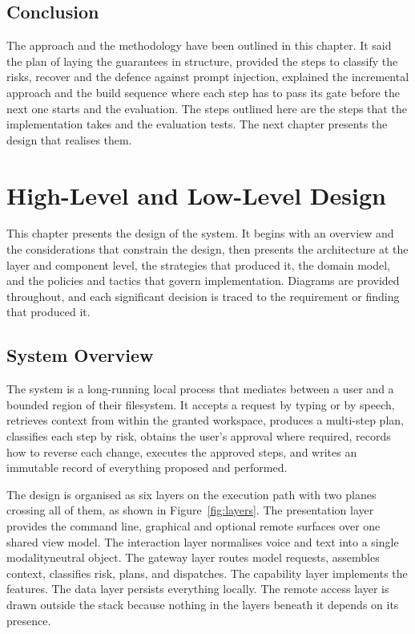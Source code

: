 \documentclass{FastFyp}
\begin{document}
\section{Conclusion}
The approach and the methodology have been outlined in this chapter. It said the plan of laying the guarantees in structure, provided the steps to classify the risks, recover and the defence against prompt injection, explained the incremental approach and the build sequence where each step has to pass its gate before the next one starts and the evaluation. The steps outlined here are the steps that the implementation takes and the evaluation tests. The next chapter presents the design that realises them.

\chapter{High-Level and Low-Level Design}
This chapter presents the design of the system. It begins with an overview and the considerations that constrain the design, then presents the architecture at the layer and component level, the strategies that produced it, the domain model, and the policies and tactics that govern implementation. Diagrams are provided throughout, and each significant decision is traced to the requirement or finding that produced it.

\section{System Overview}
The system is a long-running local process that mediates between a user and a bounded region of their filesystem. It accepts a request by typing or by speech, retrieves context from within the granted workspace, produces a multi-step plan, classifies each step by risk, obtains the user's approval where required, records how to reverse each change, executes the approved steps, and writes an immutable record of everything proposed and performed.

The design is organised as six layers on the execution path with two planes crossing all of them, as shown in Figure~\ref{fig:layers}. The presentation layer provides the command line, graphical and optional remote surfaces over one shared view model. The interaction layer normalises voice and text into a single modalityneutral object. The gateway layer routes model requests, assembles context, classifies risk, plans, and dispatches. The capability layer implements the features. The data layer persists everything locally. The remote access layer is drawn outside the stack because nothing in the layers beneath it depends on its presence.
\end{document}
